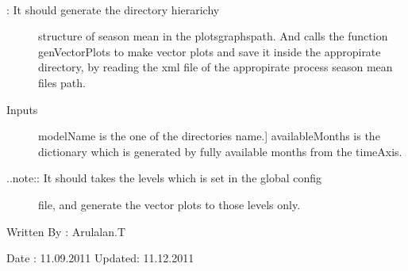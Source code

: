 \documentclass[letterpaper,10pt,english]{sphinxmanual}
\begin{document}
\begin{fulllineitems}
\label{diagnosis:generate_winds_plots.genSeasonMeanDirs}~\begin{description}
\item[{{\hyperref[diagnosis:generate_winds_plots.genSeasonMeanDirs]{}}: It should generate the directory hierarichy}] \leavevmode
structure of season mean in the plotsgraphspath. And calls the
function genVectorPlots to make vector plots and save it inside the
appropirate directory, by reading the xml file of the appropirate
process season mean files path.

\item[{Inputs}] \leavevmode{[}modelName is the one of the directories name.{]}
availableMonths is the dictionary which is generated by fully
available months from the timeAxis.

\item[{..note:: It should takes the levels which is set in the global config}] \leavevmode
file, and generate the vector plots to those levels only.

\end{description}

Written By : Arulalan.T

Date : 11.09.2011
Updated: 11.12.2011

\end{fulllineitems}

\end{document}
